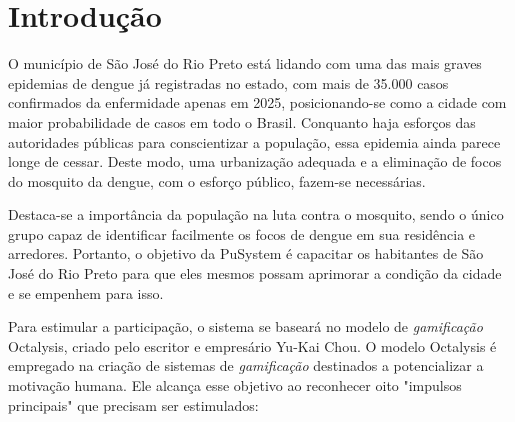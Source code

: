 \documentclass[a4paper, 12pt]{article}
\begin{document}
\section{Introdução}
O município de São José do Rio Preto está lidando com uma das mais graves epidemias de dengue já registradas no estado, com mais de 35.000 casos confirmados da enfermidade apenas em 2025, posicionando-se como a cidade com maior probabilidade de casos em todo o Brasil. Conquanto haja esforços das autoridades públicas para conscientizar a população, essa epidemia ainda parece longe de cessar. Deste modo, uma urbanização adequada e a eliminação de focos do mosquito da dengue, com o esforço público, fazem-se necessárias.

Destaca-se a importância da população na luta contra o mosquito, sendo o único grupo capaz de identificar facilmente os focos de dengue em sua residência e arredores. Portanto, o objetivo da PuSystem é capacitar os habitantes de São José do Rio Preto para que eles mesmos possam aprimorar a condição da cidade e se empenhem para isso.

Para estimular a participação, o sistema se baseará no modelo de \textit{gamificação} Octalysis, criado pelo escritor e empresário Yu-Kai Chou.  O modelo Octalysis é empregado na criação de sistemas de \textit{gamificação} destinados a potencializar a motivação humana.  Ele alcança esse objetivo ao reconhecer oito "impulsos principais" que precisam ser estimulados:
\end{document}

